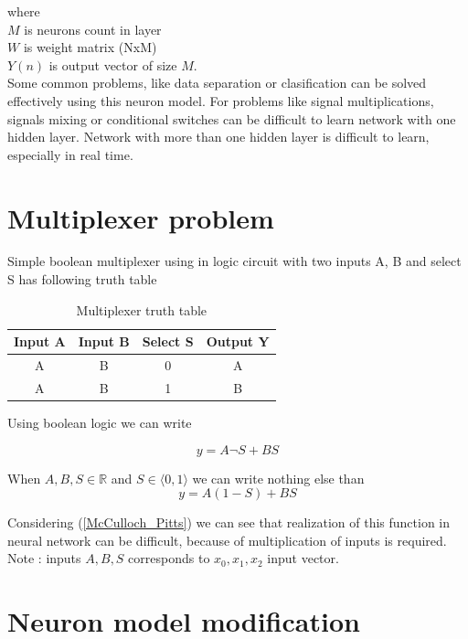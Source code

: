 \documentclass[10pt,a5paper]{article}
\begin{document}
where \\
$M$ is neurons count in layer \\
$W$ is weight matrix (NxM)\\
$Y(n)$ is output vector of size $M$. \\

Some common problems, like data separation or clasification can be solved effectively
  using this neuron model. For problems like signal multiplications, signals
mixing or conditional switches can be difficult to learn network with one hidden layer.
Network with more than one hidden layer is difficult to learn, especially in real time.

\section{Multiplexer problem}

Simple boolean multiplexer using in logic circuit with two inputs A, B and
select S has following truth table

\begin{table}[!ht]
\caption{Multiplexer truth table}
\label{table_example}
\centering
\begin{tabular}{|c|c|c||c|}
\hline
Input A & Input B & Select S & Output Y\\
\hline
A & B & 0 & A\\
\hline
A & B & 1 & B\\
\hline
\end{tabular}
\end{table}

Using boolean logic we can write

\begin{equation}
\label{boolean mux}
  y = A\neg S + BS
\end{equation}

When $A, B, S \in \mathbb{R}$ and $S \in \langle 0, 1 \rangle$ we can write nothing else than
\begin{equation}
\label{boolean mux}
  y = A(1-S) + BS
\end{equation}

Considering (\ref{McCulloch_Pitts}) we can see that realization
  of this function in neural network can be difficult, because of multiplication of inputs
  is required. Note : inputs $A, B, S$ corresponds to $x_0, x_1, x_2$ input vector.

\section{Neuron model modification}
\end{document}
